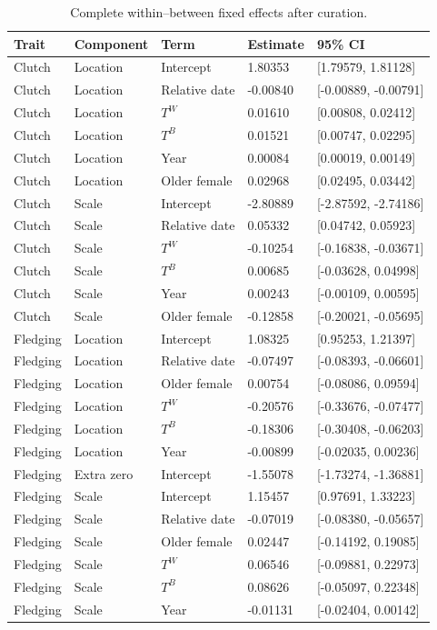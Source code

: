 \documentclass{article}
\begin{document}
\begin{table}[!ht]\centering\scriptsize\singlespacing
\caption{Complete within--between fixed effects after curation.}\label{tab:within-between-fixed}
\begin{tabular}{lllll}\toprule
Trait & Component & Term & Estimate & 95\% CI\\\midrule
Clutch & Location & Intercept & 1.80353 & [1.79579, 1.81128]\\
Clutch & Location & Relative date & -0.00840 & [-0.00889, -0.00791]\\
Clutch & Location & $T^W$ & 0.01610 & [0.00808, 0.02412]\\
Clutch & Location & $T^B$ & 0.01521 & [0.00747, 0.02295]\\
Clutch & Location & Year & 0.00084 & [0.00019, 0.00149]\\
Clutch & Location & Older female & 0.02968 & [0.02495, 0.03442]\\
Clutch & Scale & Intercept & -2.80889 & [-2.87592, -2.74186]\\
Clutch & Scale & Relative date & 0.05332 & [0.04742, 0.05923]\\
Clutch & Scale & $T^W$ & -0.10254 & [-0.16838, -0.03671]\\
Clutch & Scale & $T^B$ & 0.00685 & [-0.03628, 0.04998]\\
Clutch & Scale & Year & 0.00243 & [-0.00109, 0.00595]\\
Clutch & Scale & Older female & -0.12858 & [-0.20021, -0.05695]\\
Fledging & Location & Intercept & 1.08325 & [0.95253, 1.21397]\\
Fledging & Location & Relative date & -0.07497 & [-0.08393, -0.06601]\\
Fledging & Location & Older female & 0.00754 & [-0.08086, 0.09594]\\
Fledging & Location & $T^W$ & -0.20576 & [-0.33676, -0.07477]\\
Fledging & Location & $T^B$ & -0.18306 & [-0.30408, -0.06203]\\
Fledging & Location & Year & -0.00899 & [-0.02035, 0.00236]\\
Fledging & Extra zero & Intercept & -1.55078 & [-1.73274, -1.36881]\\
Fledging & Scale & Intercept & 1.15457 & [0.97691, 1.33223]\\
Fledging & Scale & Relative date & -0.07019 & [-0.08380, -0.05657]\\
Fledging & Scale & Older female & 0.02447 & [-0.14192, 0.19085]\\
Fledging & Scale & $T^W$ & 0.06546 & [-0.09881, 0.22973]\\
Fledging & Scale & $T^B$ & 0.08626 & [-0.05097, 0.22348]\\
Fledging & Scale & Year & -0.01131 & [-0.02404, 0.00142]\\
\bottomrule\end{tabular}\end{table}
\end{document}
